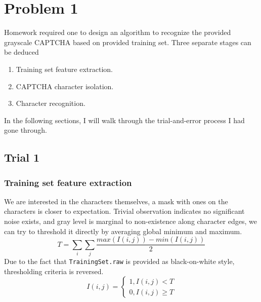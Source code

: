 \documentclass[12pt]{article}
\begin{document}
\section*{Problem 1}
Homework required one to design an algorithm to recognize the provided grayscale CAPTCHA based on provided training set.
Three separate stages can be deduced
\begin{enumerate}[itemsep=0px]
\item Training set feature extraction.
\item CAPTCHA character isolation.
\item Character recognition.
\end{enumerate}
In the following sections, I will walk through the trial-and-error process I had gone through.

\subsection*{Trial 1}
\subsubsection*{Training set feature extraction}
We are interested in the characters themselves, a mask with ones on the characters is closer to expectation. Trivial observation indicates no significant noise exists, and gray level is marginal to non-existence along character edges, we can try to threshold it directly by averaging global minimum and maximum. 
\begin{equation}
T = \sum_i \sum_j \frac{max(I(i, j))-min(I(i,j))}{2}
\end{equation}
Due to the fact that {\tt TrainingSet.raw} is provided as black-on-white style, thresholding criteria is reversed.
\begin{equation}
I(i, j) = 
\begin{cases}
	1, I(i, j) < T \\
	0, I(i, j) \geq T
\end{cases}
\end{equation}
\end{document}
